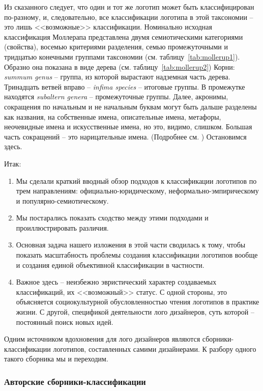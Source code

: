 Из сказанного следует, что один и тот же логотип может быть классифицирован по-разному, и,
следовательно, все классификации логотипа в этой таксономии -- это лишь <<возможные>>
классификации. Номинально исходная классификация Моллерапа представлена двумя семиотическими
категориями (свойства), восемью критериями разделения, семью промежуточными и тридцатью конечными
группами таксономии (см. таблицу~\ref{tab:mollerup1}). Образно она показана в виде дерева
(см. таблицу~\ref{tab:mollerup2}) Корни: \emph{summum genus} -- группа, из которой вырастают надземная
часть дерева. Тринадцать ветвей вправо -- \emph{infima species} -- итоговые группы. В промежутке
находятся \emph{subaltern genera} -- промежуточные группы. Далее, акронимы, сокращения по начальным
и не начальным буквам могут быть дальше разделены как названия, на собственные имена, описательные
имена, метафоры, неочевидные имена и искусственные имена, но это, видимо, слишком. Большая часть
сокращений -- это нарицательные имена. (Подробнее см. \autocite[][98-123]{mollerup1999marks})
Остановимся здесь.

Итак:
\begin{enumerate}
\item Мы сделали краткий вводный обзор подходов к классификации логотипов по трем направлениям:
  официально-юридическому, неформально-эмпирическому и популярно-семиотическому.
\item Мы постарались показать сходство между этими подходами и проиллюстрировать различия.
\item Основная задача нашего изложения в этой части сводилась к тому, чтобы показать масштабность
  проблемы создания классификации логотипов вообще и создания единой объективной классификации в
  частности.
\item Важное здесь -- неизбежно эвристический характер создаваемых классификаций, их <<возможный>>
  статус. С одной стороны, это объясняется социокультурной обусловленностью чтения логотипов в
  практике жизни. С другой, спецификой деятельности лого дизайнеров, суть которой -- постоянный поиск
  новых идей.
\end{enumerate}

Одним источником вдохновения для лого дизайнеров являются сборники-классификации логотипов,
составленных самими дизайнерами. К разбору одного такого сборника мы и переходим.

\subsubsection{Авторские сборники-классификации}
\label{2.2}

